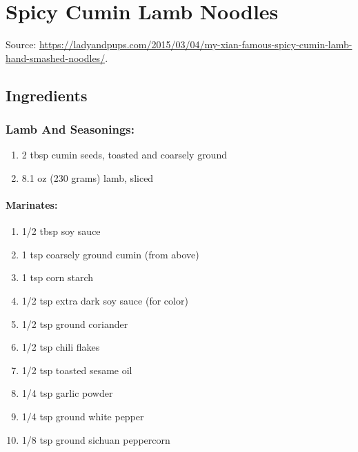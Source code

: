 \documentclass[
]{article}
\providecommand{\tightlist}{%
  \setlength{\itemsep}{0pt}\setlength{\parskip}{0pt}}
\begin{document}
\hypertarget{spicy-cumin-lamb-noodles}{%
\section{Spicy Cumin Lamb Noodles}\label{spicy-cumin-lamb-noodles}}

Source: \url{https://ladyandpups.com/2015/03/04/my-xian-famous-spicy-cumin-lamb-hand-smashed-noodles/}.

\hypertarget{ingredients-6}{%
\subsection{Ingredients}\label{ingredients-6}}

\hypertarget{lamb-and-seasonings}{%
\subsubsection{Lamb And Seasonings:}\label{lamb-and-seasonings}}

\begin{enumerate}
\def\labelenumi{\arabic{enumi}.}
\tightlist
\item
  2 tbsp cumin seeds, toasted and coarsely ground
\item
  8.1 oz (230 grams) lamb, sliced
\end{enumerate}

\hypertarget{marinates}{%
\paragraph{Marinates:}\label{marinates}}

\begin{enumerate}
\def\labelenumi{\arabic{enumi}.}
\tightlist
\item
  1/2 tbsp soy sauce
\item
  1 tsp coarsely ground cumin (from above)
\item
  1 tsp corn starch
\item
  1/2 tsp extra dark soy sauce (for color)
\item
  1/2 tsp ground coriander
\item
  1/2 tsp chili flakes
\item
  1/2 tsp toasted sesame oil
\item
  1/4 tsp garlic powder
\item
  1/4 tsp ground white pepper
\item
  1/8 tsp ground sichuan peppercorn
\end{enumerate}
\end{document}
